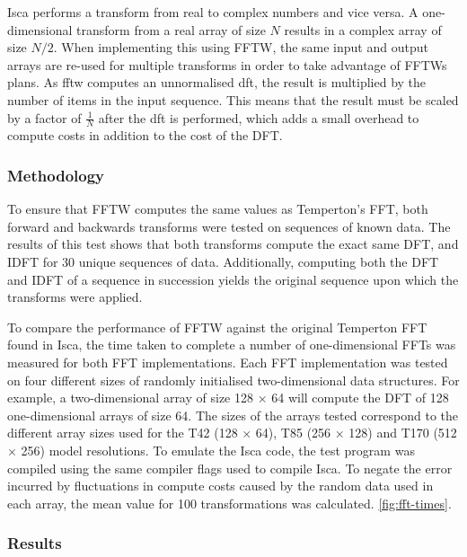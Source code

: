 \documentclass[a4paper,11pt]{report}
\begin{document}
\par
Isca performs a transform from real to complex numbers and vice versa. A one-dimensional transform from a real array of size $N$ results in a complex array of size $N/2$. When implementing this using FFTW, the same input and output arrays are re-used for multiple transforms in order to take advantage of FFTWs plans. As \gls{fftw} computes an unnormalised \gls{dft}, the result is multiplied by the number of items in the input sequence. This means that the result must be scaled by a factor of $\frac{1}{N}$ after the \gls{dft} is performed, which adds a small overhead to compute costs in addition to the cost of the DFT.  

\subsubsection{Methodology}
To ensure that FFTW computes the same values as Temperton's FFT, both forward and backwards transforms were tested on sequences of known data. The results of this test shows that both transforms compute the exact same DFT, and IDFT for 30 unique sequences of data. Additionally, computing both the DFT and IDFT of a sequence in succession yields the original sequence upon which the transforms were applied.
\par
To compare the performance of FFTW against the original Temperton FFT found in Isca, the time taken to complete a number of one-dimensional FFTs was measured for both FFT implementations. Each FFT implementation was tested on four different sizes of randomly initialised two-dimensional data structures. For example, a two-dimensional array of size 128 $\times$ 64 will compute the DFT of 128 one-dimensional arrays of size 64. The sizes of the arrays tested correspond to the different array sizes used for the T42 (128 $\times$ 64), T85 (256 $\times$ 128) and T170 (512 $\times$ 256) model resolutions. To emulate the Isca code, the test program was compiled using the same compiler flags used to compile Isca. To negate the error incurred by fluctuations in compute costs caused by the random data used in each array, the mean value for 100 transformations was calculated.  \ref{fig:fft-times}.

\subsubsection{Results}
\end{document}
